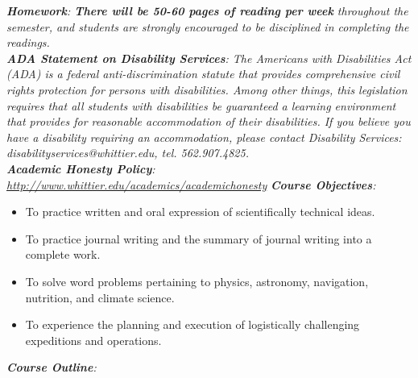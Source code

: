 \documentclass[10pt]{article}
\begin{document}
\textit{\textbf{Homework}: \textbf{There will be 50-60 pages of reading per week} throughout the semester, and students are strongly encouraged to be disciplined in completing the readings.} \\
\textit{\textbf{ADA Statement on Disability Services}: The Americans with Disabilities Act (ADA) is a federal anti-discrimination statute that provides comprehensive civil rights protection for persons with disabilities. Among other things, this legislation requires that all students with disabilities be guaranteed a learning environment that provides for reasonable accommodation of their disabilities. If you believe you have a disability requiring an accommodation, please contact Disability Services: disabilityservices@whittier.edu, tel. 562.907.4825.} \\
\textit{\textbf{Academic Honesty Policy}: \url{http://www.whittier.edu/academics/academichonesty}}
\clearpage
\textit{\textbf{Course Objectives}:}
\begin{itemize}
\item To practice written and oral expression of scientifically technical ideas.
\item To practice journal writing and the summary of journal writing into a complete work.
\item To solve word problems pertaining to physics, astronomy, navigation, nutrition, and climate science.
\item To experience the planning and execution of logistically challenging expeditions and operations. 
\end{itemize}
\textit{\textbf{Course Outline}:}
\end{document}
